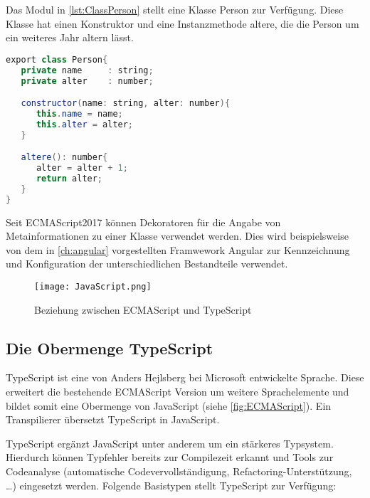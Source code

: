 Das Modul in \autoref{lst:ClassPerson} stellt eine Klasse Person zur Verfügung. Diese Klasse hat einen Konstruktor und eine Instanzmethode altere, die die Person um ein weiteres Jahr altern lässt.

\begin{lstlisting}[caption=Eine Klasse Person wird von einem Modul bereitgestellt , label=lst:ClassPerson, language=Java]
export class Person{
   private name 	: string;
   private alter 	: number;

   constructor(name: string, alter: number){
      this.name = name;
      this.alter = alter;
   }

   altere(): number{
      alter = alter + 1;
      return alter;
   }
}
\end{lstlisting}

Seit ECMAScript2017 können Dekoratoren für die Angabe von Metainformationen zu einer Klasse verwendet werden. Dies wird beispielsweise von dem in \autoref{ch:angular} vorgestellten Framwework Angular zur Kennzeichnung und Konfiguration der unterschiedlichen Bestandteile verwendet.\autocites[vgl.][30\psqq]{Woiwode.2018} 

\begin{figure}[h]
	\centering
	\texttt{[image: JavaScript.png]}
	\caption{Beziehung zwischen ECMAScript und TypeScript} 
	\label{fig:ECMAScript}
\end{figure}

\subsection{Die Obermenge TypeScript}
TypeScript ist eine von Anders Hejlsberg bei Microsoft entwickelte Sprache. Diese erweitert die bestehende ECMAScript Version um weitere Sprachelemente und bildet somit eine Obermenge von JavaScript (siehe \autoref{fig:ECMAScript}). Ein Transpilierer übersetzt TypeScript in JavaScript. 

TypeScript ergänzt JavaScript unter anderem um ein stärkeres Typsystem. Hierdurch können Typfehler bereits zur Compilezeit erkannt und Tools zur Codeanalyse (automatische Codevervollständigung, Refactoring-Unterstützung, …) eingesetzt werden.\autocites[vgl.][27\psqq]{Woiwode.2018}[vgl.][13\psqq]{Steyer.2017}[vgl.][10]{Zeigermann.2016} Folgende Basistypen stellt TypeScript zur Verfügung: \autocites[vgl.][34\psqq]{Woiwode.2018}[vgl.][16\psqq]{Steyer.2017}

